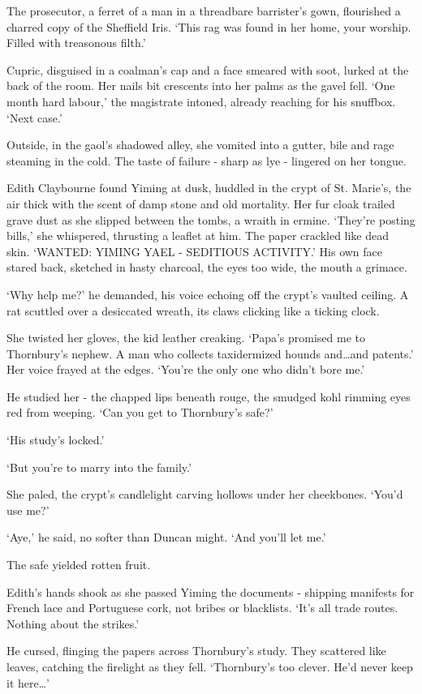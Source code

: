 The prosecutor, a ferret of a man in a threadbare barrister's gown, flourished a charred copy of the Sheffield Iris. `This rag was found in her home, your worship. Filled with treasonous filth.'

Cupric, disguised in a coalman's cap and a face smeared with soot, lurked at the back of the room. Her nails bit crescents into her palms as the gavel fell. `One month hard labour,' the magistrate intoned, already reaching for his snuffbox. `Next case.'

Outside, in the gaol's shadowed alley, she vomited into a gutter, bile and rage steaming in the cold. The taste of failure - sharp as lye - lingered on her tongue.

Edith Claybourne found Yiming at dusk, huddled in the crypt of St. Marie's, the air thick with the scent of damp stone and old mortality. Her fur cloak trailed grave dust as she slipped between the tombs, a wraith in ermine. `They're posting bills,' she whispered, thrusting a leaflet at him. The paper crackled like dead skin. `WANTED: YIMING YAEL - SEDITIOUS ACTIVITY.' His own face stared back, sketched in hasty charcoal, the eyes too wide, the mouth a grimace.

`Why help me?' he demanded, his voice echoing off the crypt's vaulted ceiling. A rat scuttled over a desiccated wreath, its claws clicking like a ticking clock.

She twisted her gloves, the kid leather creaking. `Papa's promised me to Thornbury's nephew. A man who collects taxidermized hounds and\dots and patents.' Her voice frayed at the edges. `You're the only one who didn't bore me.'

He studied her - the chapped lips beneath rouge, the smudged kohl rimming eyes red from weeping. `Can you get to Thornbury's safe?'

`His study's locked.'

`But you're to marry into the family.'

She paled, the crypt's candlelight carving hollows under her cheekbones. `You'd use me?'

`Aye,' he said, no softer than Duncan might. `And you'll let me.'

The safe yielded rotten fruit.

Edith's hands shook as she passed Yiming the documents - shipping manifests for French lace and Portuguese cork, not bribes or blacklists. `It's all trade routes. Nothing about the strikes.'

He cursed, flinging the papers across Thornbury's study. They scattered like leaves, catching the firelight as they fell. `Thornbury's too clever. He'd never keep it here\dots'

